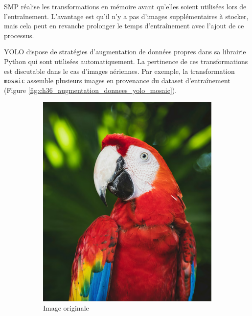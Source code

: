 SMP réalise les transformations en mémoire avant qu'elles soient utilisées lors de l'entraînement. L'avantage est qu'il n'y a pas d'images supplémentaires à stocker, mais cela peut en revanche prolonger le temps d'entraînement avec l'ajout de ce processus.

YOLO dispose de stratégies d'augmentation de données propres dans sa librairie Python qui sont utilisées automatiquement. La pertinence de ces transformations est discutable dans le cas d'images aériennes. Par exemple, la transformation \texttt{mosaic} assemble plusieurs images en provenance du dataset d'entraînement (Figure \ref{fig:ch36_augmentation_donnees_yolo_mosaic}).

\begin{figure}[H]
    \centering
    \begin{subfigure}[b]{0.42\textwidth}
        \centering
        \includegraphics[width=\textwidth]{02-main/figures/ch3/ch36_augmentations_00a_yolo_exemple1_original.png}
        \caption{Image originale}
        \label{fig:ch36_augmentations_00a_yolo_exemple1_original}
    \end{subfigure}
    \hfill
    \begin{subfigure}[b]{0.49\textwidth}

\end{subfigure}
\end{figure}
